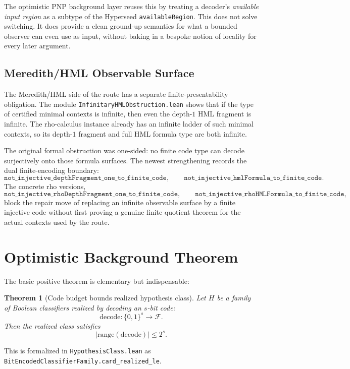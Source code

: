\documentclass[11pt]{article}
\newtheorem{theorem}{Theorem}[section]
\theoremstyle{remark}
\begin{document}
The optimistic PNP background layer reuses this by treating a decoder's \emph{available
input region} as a subtype of the Hyperseed \texttt{availableRegion}.  This does not solve
switching.  It does provide a clean ground-up semantics for what a bounded observer can even
use as input, without baking in a bespoke notion of locality for every later argument.

\subsection{Meredith/HML Observable Surface}

The Meredith/HML side of the route has a separate finite-presentability obligation.  The module
\texttt{InfinitaryHMLObstruction.lean} shows that if the type of certified minimal contexts is
infinite, then even the depth-\(1\) HML fragment is infinite.  The rho-calculus instance already
has an infinite ladder of such minimal contexts, so its depth-\(1\) fragment and full HML formula
type are both infinite.

The original formal obstruction was one-sided: no finite code type can decode surjectively onto
those formula surfaces.  The newest strengthening records the dual finite-encoding boundary:
\[
  \texttt{not\_injective\_depthFragment\_one\_to\_finite\_code},
  \qquad
  \texttt{not\_injective\_hmlFormula\_to\_finite\_code}.
\]
The concrete rho versions,
\[
  \texttt{not\_injective\_rhoDepthFragment\_one\_to\_finite\_code},
  \qquad
  \texttt{not\_injective\_rhoHMLFormula\_to\_finite\_code},
\]
block the repair move of replacing an infinite observable surface by a finite injective code
without first proving a genuine finite quotient theorem for the actual contexts used by the route.

\section{Optimistic Background Theorem}

The basic positive theorem is elementary but indispensable:

\begin{theorem}[Code budget bounds realized hypothesis class]
Let \(H\) be a family of Boolean classifiers realized by decoding an \(s\)-bit code:
\[
  \mathrm{decode} : \{0,1\}^s \to \mathcal{F}.
\]
Then the realized class satisfies
\[
  |\mathrm{range}(\mathrm{decode})| \le 2^s.
\]
\end{theorem}

\noindent
This is formalized in \texttt{HypothesisClass.lean} as
\texttt{BitEncodedClassifierFamily.card\_realized\_le}.
\end{document}
